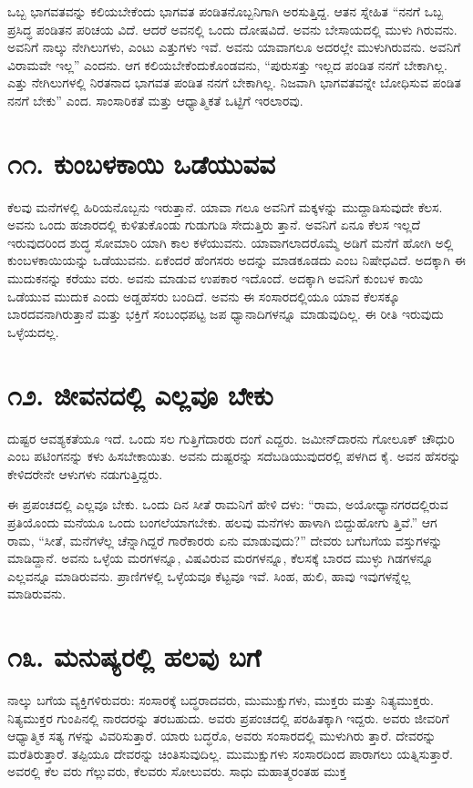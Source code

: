 ಒಬ್ಬ ಭಾಗವತವನ್ನು ಕಲಿಯಬೇಕೆಂದು ಭಾಗವತ ಪಂಡಿತನೊಬ್ಬನಿಗಾಗಿ ಅರಸುತ್ತಿದ್ದ. ಆತನ ಸ್ನೇಹಿತ “ನನಗೆ ಒಬ್ಬ ಪ್ರಸಿದ್ಧ ಪಂಡಿತನ ಪರಿಚಯ ವಿದೆ. ಆದರೆ ಅವನಲ್ಲಿ ಒಂದು ದೋಷವಿದೆ. ಅವನು ಬೇಸಾಯದಲ್ಲಿ ಮುಳು ಗಿರುವನು. ಅವನಿಗೆ ನಾಲ್ಕು ನೇಗಿಲುಗಳು, ಎಂಟು ಎತ್ತುಗಳು ಇವೆ. ಅವನು ಯಾವಾಗಲೂ ಅದರಲ್ಲೇ ಮುಳುಗಿರುವನು. ಅವನಿಗೆ ವಿರಾಮವೇ ಇಲ್ಲ” ಎಂದನು. ಆಗ ಕಲಿಯಬೇಕೆಂದುಕೊಂಡವನು, “ಪುರುಸತ್ತು ಇಲ್ಲದ ಪಂಡಿತ ನನಗೆ ಬೇಕಾಗಿಲ್ಲ. ಎತ್ತು ನೇಗಿಲುಗಳಲ್ಲಿ ನಿರತನಾದ ಭಾಗವತ ಪಂಡಿತ ನನಗೆ ಬೇಕಾಗಿಲ್ಲ. ನಿಜವಾಗಿ ಭಾಗವತವನ್ನೇ ಬೋಧಿಸುವ ಪಂಡಿತ ನನಗೆ ಬೇಕು” ಎಂದ. ಸಾಂಸಾರಿಕತೆ ಮತ್ತು ಆಧ್ಯಾತ್ಮಿಕತೆ ಒಟ್ಟಿಗೆ ಇರಲಾರವು.


\section{\num{೧೧.} ಕುಂಬಳಕಾಯಿ ಒಡೆಯುವವ}

ಕೆಲವು ಮನೆಗಳಲ್ಲಿ ಹಿರಿಯನೊಬ್ಬನು ಇರುತ್ತಾನೆ. ಯಾವಾ ಗಲೂ ಅವನಿಗೆ ಮಕ್ಕಳನ್ನು ಮುದ್ದಾಡಿಸುವುದೇ ಕೆಲಸ. ಅವನು ಒಂದು ಹಜಾರದಲ್ಲಿ ಕುಳಿತುಕೊಂಡು ಗುಡುಗುಡಿ ಸೇದುತ್ತಿರು ತ್ತಾನೆ. ಅವನಿಗೆ ಏನೂ ಕೆಲಸ ಇಲ್ಲದೆ ಇರುವುದರಿಂದ ಶುದ್ಧ ಸೋಮಾರಿ ಯಾಗಿ ಕಾಲ ಕಳೆಯುವನು. ಯಾವಾಗಲಾದರೊಮ್ಮೆ ಅಡಿಗೆ ಮನೆಗೆ ಹೋಗಿ ಅಲ್ಲಿ ಕುಂಬಳಕಾಯಿಯನ್ನು ಒಡೆಯುವನು. ಏಕೆಂದರೆ ಹೆಂಗಸರು ಅದನ್ನು ಮಾಡಕೂಡದು ಎಂಬ ನಿಷೇಧವಿದೆ. ಅದಕ್ಕಾಗಿ ಈ ಮುದುಕನನ್ನು ಕರೆಯು ವರು. ಅವನು ಮಾಡುವ ಉಪಕಾರ ಇದೊಂದೆ. ಅದಕ್ಕಾಗಿ ಅವನಿಗೆ ಕುಂಬಳ ಕಾಯಿ ಒಡೆಯುವ ಮುದುಕ ಎಂದು ಅಡ್ಡಹೆಸರು ಬಂದಿದೆ. ಅವನು ಈ ಸಂಸಾರದಲ್ಲಿಯೂ ಯಾವ ಕೆಲಸಕ್ಕೂ ಬಾರದವನಾಗಿರುತ್ತಾನೆ ಮತ್ತು ಭಕ್ತಿಗೆ ಸಂಬಂಧಪಟ್ಟ ಜಪ ಧ್ಯಾನಾದಿಗಳನ್ನೂ ಮಾಡುವುದಿಲ್ಲ. ಈ ರೀತಿ ಇರುವುದು ಒಳ್ಳೆಯದಲ್ಲ.


\section{\num{೧೨.} ಜೀವನದಲ್ಲಿ ಎಲ್ಲವೂ ಬೇಕು}

ದುಷ್ಟರ ಆವಶ್ಯಕತೆಯೂ ಇದೆ. ಒಂದು ಸಲ ಗುತ್ತಿಗೆದಾರರು ದಂಗೆ ಎದ್ದರು. ಜಮೀನ್​ದಾರನು ಗೋಲೂಕ್ ಚೌಧುರಿ ಎಂಬ ಪಟಿಂಗನನ್ನು ಕಳು ಹಿಸಬೇಕಾಯಿತು. ಅವನು ದುಷ್ಟರನ್ನು ಸದೆಬಡಿಯುವುದರಲ್ಲಿ ಪಳಗಿದ ಕೈ. ಅವನ ಹೆಸರನ್ನು ಕೇಳಿದರೇನೇ ಆಳುಗಳು ನಡುಗುತ್ತಿದ್ದರು.

ಈ ಪ್ರಪಂಚದಲ್ಲಿ ಎಲ್ಲವೂ ಬೇಕು. ಒಂದು ದಿನ ಸೀತೆ ರಾಮನಿಗೆ ಹೇಳಿ ದಳು: “ರಾಮ, ಅಯೋಧ್ಯಾನಗರದಲ್ಲಿರುವ ಪ್ರತಿಯೊಂದು ಮನೆಯೂ ಒಂದು ಬಂಗಲೆಯಾಗಬೇಕು. ಹಲವು ಮನೆಗಳು ಹಾಳಾಗಿ ಬಿದ್ದುಹೋಗು ತ್ತಿವೆ.” ಆಗ ರಾಮ, “ಸೀತೆ, ಮನೆಗಳೆಲ್ಲ ಚೆನ್ನಾಗಿದ್ದರೆ ಗಾರೆಕಾರರು ಏನು ಮಾಡುವುದು?” ದೇವರು ಬಗೆಬಗೆಯ ವಸ್ತುಗಳನ್ನು ಮಾಡಿದ್ದಾನೆ. ಅವನು ಒಳ್ಳೆಯ ಮರಗಳನ್ನೂ, ವಿಷವಿರುವ ಮರಗಳನ್ನೂ, ಕೆಲಸಕ್ಕೆ ಬಾರದ ಮುಳ್ಳು ಗಿಡಗಳನ್ನೂ ಎಲ್ಲವನ್ನೂ ಮಾಡಿರುವನು. ಪ್ರಾಣಿಗಳಲ್ಲಿ ಒಳ್ಳೆಯವೂ ಕೆಟ್ಟವೂ ಇವೆ. ಸಿಂಹ, ಹುಲಿ, ಹಾವು ಇವುಗಳನ್ನೆಲ್ಲ ಮಾಡಿರುವನು.


\section{\num{೧೩.} ಮನುಷ್ಯರಲ್ಲಿ ಹಲವು ಬಗೆ}

ನಾಲ್ಕು ಬಗೆಯ ವ್ಯಕ್ತಿಗಳಿರುವರು: ಸಂಸಾರಕ್ಕೆ ಬದ್ಧರಾದವರು, ಮುಮುಕ್ಷುಗಳು, ಮುಕ್ತರು ಮತ್ತು ನಿತ್ಯಮುಕ್ತರು. ನಿತ್ಯಮುಕ್ತರ ಗುಂಪಿನಲ್ಲಿ ನಾರದರನ್ನು ತರಬಹುದು. ಅವರು ಪ್ರಪಂಚದಲ್ಲಿ ಪರಹಿತಕ್ಕಾಗಿ ಇದ್ದರು. ಅವರು ಜೀವರಿಗೆ ಆಧ್ಯಾತ್ಮಿಕ ಸತ್ಯ ಗಳನ್ನು ವಿವರಿಸುತ್ತಾರೆ. ಯಾರು ಬದ್ಧರೊ, ಅವರು ಸಂಸಾರದಲ್ಲಿ ಮುಳುಗಿರು ತ್ತಾರೆ. ದೇವರನ್ನು ಮರೆತಿರುತ್ತಾರೆ. ತಪ್ಪಿಯೂ ದೇವರನ್ನು ಚಿಂತಿಸುವುದಿಲ್ಲ. ಮುಮುಕ್ಷುಗಳು ಸಂಸಾರದಿಂದ ಪಾರಾಗಲು ಯತ್ನಿಸುತ್ತಾರೆ. ಅವರಲ್ಲಿ ಕೆಲ ವರು ಗೆಲ್ಲುವರು, ಕೆಲವರು ಸೋಲುವರು. ಸಾಧು ಮಹಾತ್ಮರಂತಹ ಮುಕ್ತ

